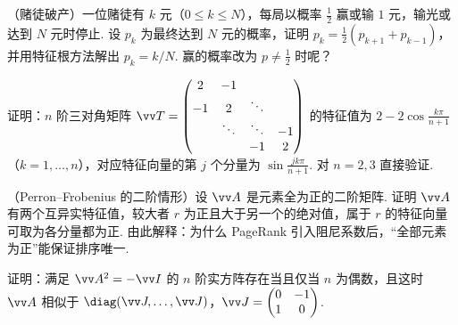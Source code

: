 {\begin{exC}
			\item\label{ex:eig:C7} （赌徒破产）一位赌徒有 $k$ 元（$0\le k\le N$），每局以概率 $\frac12$ 赢或输 $1$ 元，输光或达到 $N$ 元时停止. 设 $p_k$ 为最终达到 $N$ 元的概率，证明 $p_k=\frac12(p_{k+1}+p_{k-1})$，并用特征根方法解出 $p_k=k/N$. 赢的概率改为 $p\ne\frac12$ 时呢？
			\item\label{ex:eig:C8} 证明：$n$ 阶三对角矩阵 $\vv T=\begin{pmatrix}2&-1&&\\-1&2&\ddots&\\&\ddots&\ddots&-1\\&&-1&2\end{pmatrix}$ 的特征值为 $2-2\cos\frac{k\pi}{n+1}$（$k=1,\ldots,n$），对应特征向量的第 $j$ 个分量为 $\sin\frac{jk\pi}{n+1}$. 对 $n=2,3$ 直接验证.
			\item\label{ex:eig:C9} （Perron–Frobenius 的二阶情形）设 $\vv A$ 是元素全为正的二阶矩阵. 证明 $\vv A$ 有两个互异实特征值，较大者 $r$ 为正且大于另一个的绝对值，属于 $r$ 的特征向量可取为各分量都为正. 由此解释：为什么 PageRank 引入阻尼系数后，“全部元素为正”能保证排序唯一.
			\item\label{ex:eig:C10} 证明：满足 $\vv A^2=-\vv I$ 的 $n$ 阶实方阵存在当且仅当 $n$ 为偶数，且这时 $\vv A$ 相似于 $\diag(\vv J,\ldots,\vv J)$，$\vv J=\begin{pmatrix}0&-1\\1&0\end{pmatrix}$.
		\end{exC}
	}

